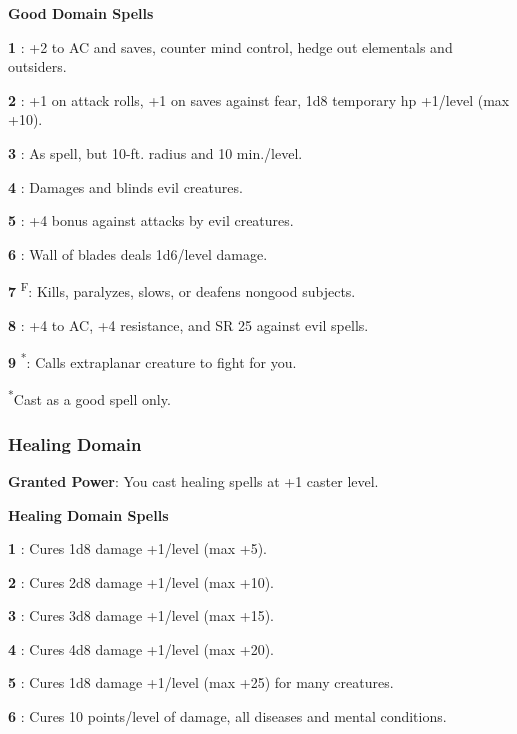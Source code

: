 \textbf{Good Domain Spells}

\textbf{1} : +2 to AC and saves, counter mind control, hedge out elementals and outsiders.

\textbf{2} : +1 on attack rolls, +1 on saves against fear, 1d8 temporary hp +1/level (max +10).

\textbf{3} : As  spell, but 10-ft. radius and 10 min./level.

\textbf{4} : Damages and blinds evil creatures.

\textbf{5} : +4 bonus against attacks by evil creatures.

\textbf{6} : Wall of blades deals 1d6/level damage.

\textbf{7} \textsuperscript{F}: Kills, paralyzes, slows, or deafens nongood subjects.

\textbf{8} : +4 to AC, +4 resistance, and SR 25 against evil spells.

\textbf{9} \textsuperscript{*}: Calls extraplanar creature to fight for you.

\textsuperscript{*}Cast as a good spell only.

\subsubsection{Healing Domain}

\textbf{Granted Power}: You cast healing spells at +1 caster level.

\textbf{Healing Domain Spells}

\textbf{1} : Cures 1d8 damage +1/level (max +5).

\textbf{2} : Cures 2d8 damage +1/level (max +10).

\textbf{3} : Cures 3d8 damage +1/level (max +15).

\textbf{4} : Cures 4d8 damage +1/level (max +20).

\textbf{5} : Cures 1d8 damage +1/level (max +25) for many creatures.

\textbf{6} : Cures 10 points/level of damage, all diseases and mental conditions.

